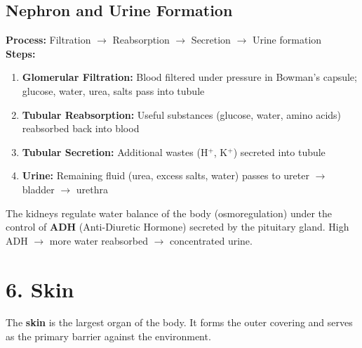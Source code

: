 \documentclass[12pt]{article}
\begin{document}
\subsection{Nephron and Urine Formation}
\begin{keybox}
\textbf{Process:} Filtration $\to$ Reabsorption $\to$ Secretion $\to$ Urine formation\\[4pt]
\textbf{Steps:}
\begin{enumerate}[leftmargin=16pt, itemsep=2pt]
  \item \textbf{Glomerular Filtration:} Blood filtered under pressure in Bowman's capsule; glucose, water, urea, salts pass into tubule
  \item \textbf{Tubular Reabsorption:} Useful substances (glucose, water, amino acids) reabsorbed back into blood
  \item \textbf{Tubular Secretion:} Additional wastes (H$^+$, K$^+$) secreted into tubule
  \item \textbf{Urine:} Remaining fluid (urea, excess salts, water) passes to ureter $\to$ bladder $\to$ urethra
\end{enumerate}
\end{keybox}

\begin{thmbox}[Osmoregulation]
The kidneys regulate water balance of the body (osmoregulation) under the control of \textbf{ADH} (Anti-Diuretic Hormone) secreted by the pituitary gland. High ADH $\to$ more water reabsorbed $\to$ concentrated urine.
\end{thmbox}

\section{6. Skin}

\begin{defbox}[Skin]
The \textbf{skin} is the largest organ of the body. It forms the outer covering and serves as the primary barrier against the environment.
\end{defbox}
\end{document}
